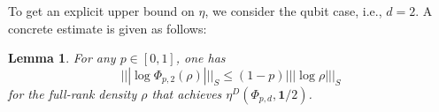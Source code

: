 \documentclass[11pt,reqno]{amsart}
\numberwithin{equation}{section}
\newtheorem{lemma}{Lemma}[section]
\newcommand{\mb}{\mathbb}
\begin{document}
To get an explicit upper bound on $\eta$, we consider the qubit case, i.e., $d = 2$. A concrete estimate is given as follows:

\begin{lemma}
For any $p\in [0,1]$, one has 
\begin{equation}
    |||\log \Phi_{p,2}(\rho)|||_S \le (1-p) |||\log \rho|||_S
\end{equation}
for the full-rank density $\rho$ that achieves $\eta^D(\Phi_{p,d},\textbf{1}/2)$.
\end{lemma}
\end{document}
